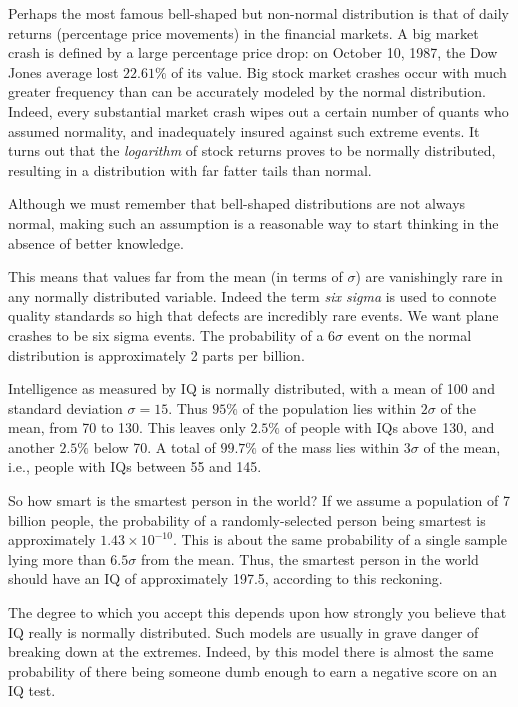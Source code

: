 \documentclass[10pt]{article}
\begin{document}
Perhaps the most famous bell-shaped but non-normal distribution is that of daily returns (percentage price movements) in the financial markets. A big market crash is defined by a large percentage price drop: on October 10, 1987, the Dow Jones average lost $22.61\%$ of its value. Big stock market crashes occur with much greater frequency than can be accurately modeled by the normal distribution. Indeed, every substantial market crash wipes out a certain number of quants who assumed normality, and inadequately insured against such extreme events. It turns out that the \textit{logarithm} of stock returns proves to be normally distributed, resulting in a distribution with far fatter tails than normal.

Although we must remember that bell-shaped distributions are not always normal, making such an assumption is a reasonable way to start thinking in the absence of better knowledge.

This means that values far from the mean (in terms of $\sigma$) are vanishingly rare in any normally distributed variable. Indeed the term \textit{six sigma} is used to connote quality standards so high that defects are incredibly rare events. We want plane crashes to be six sigma events. The probability of a $6 \sigma$ event on the normal distribution is approximately 2 parts per billion.

Intelligence as measured by IQ is normally distributed, with a mean of 100 and standard deviation $\sigma=15$. Thus $95 \%$ of the population lies within $2 \sigma$ of the mean, from 70 to 130. This leaves only $2.5 \%$ of people with IQs above 130, and another $2.5 \%$ below 70. A total of $99.7 \%$ of the mass lies within $3 \sigma$ of the mean, i.e., people with IQs between 55 and 145.

So how smart is the smartest person in the world? If we assume a population of 7 billion people, the probability of a randomly-selected person being smartest is approximately $1.43 \times 10^{-10}$. This is about the same probability of a single sample lying more than $6.5 \sigma$ from the mean. Thus, the smartest person in the world should have an IQ of approximately 197.5, according to this reckoning.

The degree to which you accept this depends upon how strongly you believe that IQ really is normally distributed. Such models are usually in grave danger of breaking down at the extremes. Indeed, by this model there is almost the same probability of there being someone dumb enough to earn a negative score on an IQ test.
\end{document}
